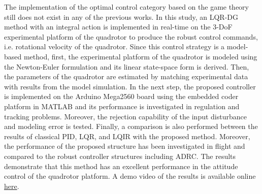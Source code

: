 \documentclass[3p]{elsarticle}
\begin{document}





The implementation of the optimal control category based on the game theory still does not exist in any of the previous works. In this study, an LQR-DG method with an integral action is implemented in real-time on the 3-DoF experimental platform of the quadrotor to produce the robust control commands, i.e. rotational velocity of the quadrotor. Since this control strategy is a model-based method, first, the experimental platform of the quadrotor is modeled using the Newton-Euler formulation and its linear state-space form is derived. Then, the parameters of the quadrotor are estimated by matching experimental data with results from the model simulation. In the next step, the proposed controller is implemented on the Arduino Mega2560 board using the embedded coder platform in MATLAB and its performance is investigated in regulation and tracking problems. Moreover, the rejection capability of the input disturbance and modeling error is tested. Finally, a comparison is also performed between the results of classical PID, LQR, and LQIR with the proposed method. Moreover, the performance of the proposed structure has been investigated in flight and compared to the robust controller structures including ADRC. The results demonstrate that this method has an excellent performance in the attitude control of the quadrotor platform. A demo video of the results is available online \href{https://youtu.be/SXZACxGaE1A?si=jxF7Uxh1Ed5-WX1J}{here}.
\end{document}
